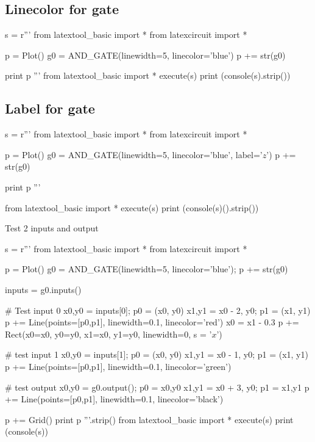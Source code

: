 \newpage
\subsection{Linecolor for gate}
\begin{python}
s = r'''
from latextool_basic import *
from latexcircuit import *

p = Plot()
g0 = AND_GATE(linewidth=5, linecolor='blue')
p += str(g0)

print p
'''
from latextool_basic import *
execute(s)
print (console(s).strip())
\end{python}


\newpage
\subsection{Label for gate}
\begin{python}
s = r'''
from latextool_basic import *
from latexcircuit import *

p = Plot()
g0 = AND_GATE(linewidth=5, linecolor='blue', label='$z$')
p += str(g0)

print p
'''

from latextool_basic import *
execute(s)
print (console(s)().strip())
\end{python}






Test 2 inputs and output
\begin{python}
s = r'''
from latextool_basic import *
from latexcircuit import *

p = Plot()
g0 = AND_GATE(linewidth=5, linecolor='blue'); p += str(g0)

inputs = g0.inputs()

# Test input 0
x0,y0 = inputs[0]; p0 = (x0, y0)
x1,y1 = x0 - 2, y0; p1 = (x1, y1)
p += Line(points=[p0,p1], linewidth=0.1, linecolor='red')
x0 = x1 - 0.3
p += Rect(x0=x0, y0=y0, x1=x0, y1=y0, linewidth=0, s = '$x$')

# test input 1
x0,y0 = inputs[1]; p0 = (x0, y0)
x1,y1 = x0 - 1, y0; p1 = (x1, y1)
p += Line(points=[p0,p1], linewidth=0.1, linecolor='green')

# test output
x0,y0 = g0.output(); p0 = x0,y0
x1,y1 = x0 + 3, y0; p1 = x1,y1
p += Line(points=[p0,p1], linewidth=0.1, linecolor='black')

p += Grid()
print p
'''.strip()
from latextool_basic import *
execute(s)
print (console(s))
\end{python}


